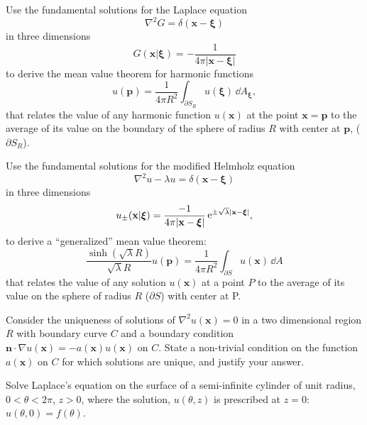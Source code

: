 {\begin{Exercise}
Use the fundamental solutions for the Laplace equation
\[
\nabla^2 G = \delta(\mathbf{x}-\boldsymbol{\xi})
\]
in three dimensions
\[ 
G(\mathbf{x}|\boldsymbol{\xi}) = - \frac{1}{4 \pi |\mathbf{x} - \boldsymbol{\xi}|}
\]
to derive the mean value theorem for harmonic functions
\[ 
u(\mathbf{p}) = \frac{1}{4 \pi R^2} \int_{\partial S_R} u(\boldsymbol{\xi})
\,\dd A_{\boldsymbol{\xi}},
\]
that relates the value of any harmonic function $u(\mathbf{x})$ at the point
$\mathbf{x} = \mathbf{p}$ to the average of its value on the boundary of 
the sphere of radius $R$ with center at $\mathbf{p}$, ($\partial S_R$). 
\end{Exercise}








\begin{Exercise}
Use the fundamental solutions for the modified Helmholz equation
\[
\nabla^2 u - \lambda u = \delta(\mathbf{x} - \boldsymbol{\xi})
\]
in three dimensions
\[ 
u_\pm(\mathbf{x}|\boldsymbol{\xi})= \frac{-1}{4 \pi |\mathbf{x} - \boldsymbol{\xi}|} 
\mathop{\mathrm{e}}\nolimits^{\pm \sqrt{\lambda} |\mathbf{x} - \boldsymbol{\xi}|},
\]
to derive a ``generalized'' mean value theorem:
\[ 
\frac{ \sinh \left( \sqrt{\lambda} R \right) }{ \sqrt{\lambda} R } u(\mathbf{p}) 
= \frac{1}{4 \pi R^2} \int_{\partial S} u(\mathbf{x}) \,\dd A
\]
that relates the value of any solution $u(\mathbf{x})$ at a point
$P$ to the average of its value on the sphere of radius $R$ ($\partial S$) 
with center at P. 
\end{Exercise}






\begin{Exercise}
Consider the uniqueness of solutions of $\nabla^2 u(\mathbf{x}) = 0$ in a
two dimensional region $R$ with boundary curve $C$ and a boundary condition
$\mathbf{n} \cdot \nabla u(\mathbf{x}) = -a (\mathbf{x})u(\mathbf{x})$ on $C$. State
a non-trivial condition on the function $a(\mathbf{x})$ on $C$ for which 
solutions are unique, and justify your answer. 
\end{Exercise}







\begin{Exercise}
Solve Laplace's equation on the surface of a semi-infinite cylinder
of unit radius, $0 < \theta < 2 \pi$, $z > 0$, where the solution, 
$u(\theta, z)$ is prescribed at $z = 0$: $u(\theta, 0) = f(\theta)$.  
\end{Exercise}







}

